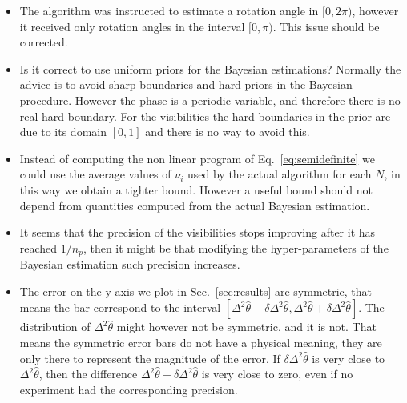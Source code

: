\documentclass[aps, pra, 10pt, twocolumn, superscriptaddress,floatfix]{revtex4-1}
\begin{document}
\begin{itemize}
	\item The algorithm was instructed to estimate a rotation angle in $[0, 2 \pi)$, however it received only rotation angles in the interval $[0, \pi)$. This issue should be corrected.
	
	\item Is it correct to use uniform priors for the Bayesian estimations? Normally the advice is to avoid sharp boundaries and hard priors in the Bayesian procedure. However the phase is a periodic variable, and therefore there is no real hard boundary. For the visibilities the hard boundaries in the prior are due to its domain $[0, 1]$ and there is no way to avoid this.
	
	
	
	\item Instead of computing the non linear program of Eq.~\eqref{eq:semidefinite} we could use the average values of $\nu_i$ used by the actual algorithm for each $N$, in this way we obtain a tighter bound. However a useful bound should not depend from quantities computed from the actual Bayesian estimation.
	
	\item It seems that the precision of the visibilities stops improving after it has reached $1/n_{p}$, then it might be that modifying the hyper-parameters of the Bayesian estimation such precision increases.
	
	\item The error on the y-axis we plot in Sec.~\ref{sec:results} are symmetric, that means the bar correspond to the interval $[\Delta^2 \hat{\theta} - \delta \Delta^2 \hat{\theta}, \Delta^2 \hat{\theta} + \delta \Delta^2 \hat{\theta}]$. The distribution of $\Delta^2 \hat{\theta}$ might however not be symmetric, and it is not. That means the symmetric error bars do not have a physical meaning, they are only there to represent the magnitude of the error. If $\delta \Delta^2 \hat{\theta}$ is very close to $\Delta^2 \hat{\theta}$, then the difference $\Delta^2 \hat{\theta} - \delta \Delta^2 \hat{\theta}$ is very close to zero, even if no experiment had the corresponding precision.
	
\end{itemize}
\end{document}
